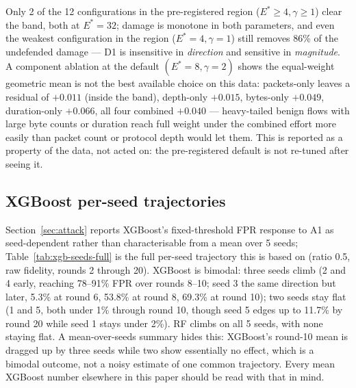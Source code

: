 Only 2 of the 12 configurations in the pre-registered region ($E^*\ge4,\gamma\ge1$) clear the
band, both at $E^*=32$; damage is monotone in both parameters, and even the weakest
configuration in the region ($E^*=4,\gamma=1$) still removes 86\% of the undefended damage —
D1 is insensitive in \emph{direction} and sensitive in \emph{magnitude}. A component ablation at
the default $(E^*=8,\gamma=2)$ shows the equal-weight geometric mean is not the best available
choice on this data: packets-only leaves a residual of $+0.011$ (inside the band), depth-only
$+0.015$, bytes-only $+0.049$, duration-only $+0.066$, all four combined $+0.040$ — heavy-tailed
benign flows with large byte counts or duration reach full weight under the combined effort more
easily than packet count or protocol depth would let them. This is reported as a property of the
data, not acted on: the pre-registered default is not re-tuned after seeing it.

\subsection{XGBoost per-seed trajectories}
Section~\ref{sec:attack} reports XGBoost's fixed-threshold FPR response to A1 as seed-dependent
rather than characterisable from a mean over 5 seeds; Table~\ref{tab:xgb-seeds-full} is the full
per-seed trajectory this is based on (ratio 0.5, raw fidelity, rounds 2 through 20). XGBoost is
bimodal: three seeds climb (2 and 4 early, reaching 78--91\% FPR over rounds 8--10; seed 3 the
same direction but later, 5.3\% at round 6, 53.8\% at round 8, 69.3\% at round 10); two seeds
stay flat (1 and 5, both under 1\% through round 10, though seed 5 edges up to 11.7\% by round
20 while seed 1 stays under 2\%). RF climbs on all 5 seeds, with none staying flat. A
mean-over-seeds summary hides this: XGBoost's round-10 mean is dragged up by three seeds while
two show essentially no effect, which is a bimodal outcome, not a noisy estimate of one common
trajectory. Every mean XGBoost number elsewhere in this paper should be read with that in mind.

